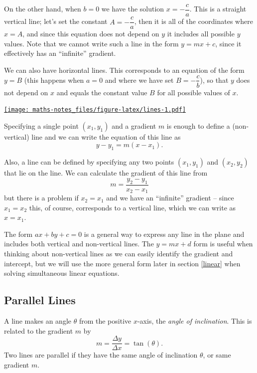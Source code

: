 \documentclass[
]{book}
\theoremstyle{definition}
\theoremstyle{definition}
\theoremstyle{definition}
\theoremstyle{definition}
\theoremstyle{remark}
\begin{document}
On the other hand, when \(b=0\) we have the solution \(x=-\dfrac{c}{a}\). This is a straight vertical line; let's set the constant \(A=-\dfrac{c}{a}\), then it is all of the coordinates where \(x=A\), and since this equation does not depend on \(y\) it includes all possible \(y\) values. Note that we cannot write such a line in the form \(y=mx+c\), since it effectively has an ``infinite'' gradient.

We can also have horizontal lines. This corresponds to an equation of the form \(y=B\) (this happens when \(a=0\) and where we have set \(B=-\dfrac{c}{b}\)), so that \(y\) does not depend on \(x\) and equals the constant value \(B\) for all possible values of \(x\).

\href{https://www.desmos.com/calculator/ao47bht5xb}{\texttt{[image: maths-notes\_files/figure-latex/lines-1.pdf]}}

Specifying a single point \((x_1,y_1)\) and a gradient \(m\) is enough to define a (non-vertical) line and we can write the equation of this line as
\[
y-y_1=m(x-x_1).
\]

Also, a line can be defined by specifying any two points \((x_1,y_1)\) and \((x_2,y_2)\) that lie on the line. We can calculate the gradient of this line from
\[
m=\frac{y_2-y_1}{x_2-x_1}
\]
but there is a problem if \(x_2=x_1\) and we have an ``infinite'' gradient -- since \(x_1=x_2\) this, of course, corresponds to a vertical line, which we can write as \(x=x_1\).

The form \(ax+by+c=0\) is a general way to express any line in the plane and includes both vertical and non-vertical lines. The \(y=mx+d\) form is useful when thinking about non-vertical lines as we can easily identify the gradient and intercept, but we will use the more general form later in section \ref{linear} when solving simultaneous linear equations.

\hypertarget{parallel-lines}{%
\subsection{Parallel Lines}\label{parallel-lines}}

A line makes an angle \(\theta\) from the positive \(x\)-axis, the \emph{angle of inclination}. This is related to the gradient \(m\) by
\[
m=\frac{\Delta y}{\Delta x}=\tan(\theta).
\]
Two lines are parallel if they have the same angle of inclination \(\theta\), or same gradient \(m\).
\end{document}
